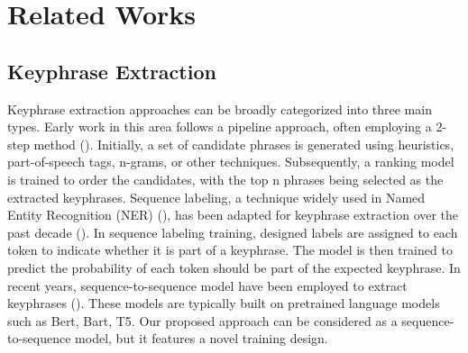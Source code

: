\section{Related Works}
\subsection{Keyphrase Extraction}
Keyphrase extraction approaches can be broadly categorized into three main types. Early work in this area follows a pipeline approach, often employing a 2-step method (\cite{hasan-ng-2014-automatic,7805062,8852151,choi2023simckpsimplecontrastivelearning}). Initially, a set of candidate phrases is generated using heuristics, part-of-speech tags, n-grams, or other techniques. Subsequently, a ranking model is trained to order the candidates, with the top n phrases being selected as the extracted keyphrases. Sequence labeling, a technique widely used in Named Entity Recognition (NER) (\cite{lample2016neuralarchitecturesnamedentity,chiu2016namedentityrecognitionbidirectional}), has been adapted for keyphrase extraction over the past decade (\cite{10.1145/3308558.3313642,luan-etal-2017-scientific,zhang-etal-2016-keyphrase,Gu_2021}). In sequence labeling training, designed labels are assigned to each token to indicate whether it is part of a keyphrase. The model is then trained to predict the probability of each token should be part of the expected keyphrase. In recent years, sequence-to-sequence model have been employed to extract keyphrases (\cite{wu2024pretrainedlanguagemodelskeyphrase,chowdhury2022applyinggenericsequencetosequencemodel,9443960}). These models are typically built on pretrained language models such as Bert, Bart, T5. Our proposed approach can be considered as a sequence-to-sequence model, but it features a novel training design.

